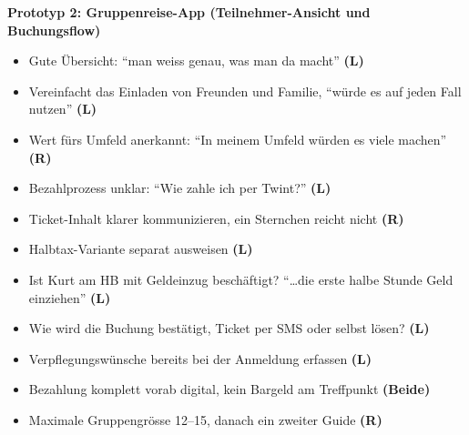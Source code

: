 \bigskip
\begin{center}\textbf{Prototyp 2: Gruppenreise-App (Teilnehmer-Ansicht und Buchungsflow)}\end{center}
\FeedbackGrid
{%
\begin{itemize}[nosep,leftmargin=1.3em]
  \item Gute Übersicht: \enquote{man weiss genau, was man da macht} \textbf{(L)}
  \item Vereinfacht das Einladen von Freunden und Familie, \enquote{würde es auf jeden Fall nutzen} \textbf{(L)}
  \item Wert fürs Umfeld anerkannt: \enquote{In meinem Umfeld würden es viele machen} \textbf{(R)}
\end{itemize}}
{%
\begin{itemize}[nosep,leftmargin=1.3em]
  \item Bezahlprozess unklar: \enquote{Wie zahle ich per Twint?} \textbf{(L)}
  \item Ticket-Inhalt klarer kommunizieren, ein Sternchen reicht nicht \textbf{(R)}
  \item Halbtax-Variante separat ausweisen \textbf{(L)}
\end{itemize}}
{%
\begin{itemize}[nosep,leftmargin=1.3em]
  \item Ist Kurt am HB mit Geldeinzug beschäftigt? \enquote{\dots die erste halbe Stunde Geld einziehen} \textbf{(L)}
  \item Wie wird die Buchung bestätigt, Ticket per SMS oder selbst lösen? \textbf{(L)}
\end{itemize}}
{%
\begin{itemize}[nosep,leftmargin=1.3em]
  \item Verpflegungswünsche bereits bei der Anmeldung erfassen \textbf{(L)}
  \item Bezahlung komplett vorab digital, kein Bargeld am Treffpunkt \textbf{(Beide)}
  \item Maximale Gruppengrösse 12--15, danach ein zweiter Guide \textbf{(R)}
\end{itemize}}

